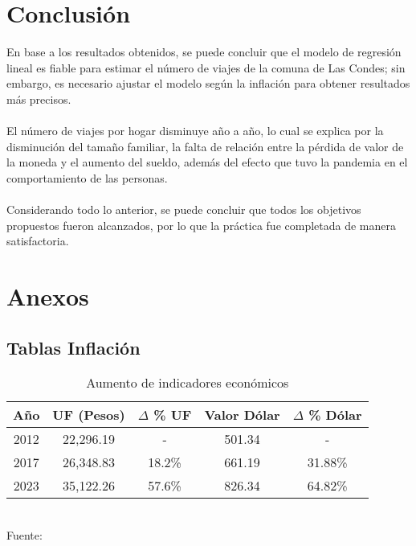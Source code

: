 \documentclass[12pt]{article} %
\begin{document}
\section{Conclusión}

En base a los resultados obtenidos, se puede concluir que el modelo de regresión lineal es fiable para estimar el número de viajes de la comuna de Las Condes; sin embargo, es necesario ajustar el modelo según la inflación para obtener resultados más precisos.
\\ \\
El número de viajes por hogar disminuye año a año, lo cual se explica por la disminución del tamaño familiar, la falta de relación entre la pérdida de valor de la moneda y el aumento del sueldo, además del efecto que tuvo la pandemia en el comportamiento de las personas.
\\ \\
Considerando todo lo anterior, se puede concluir que todos los objetivos propuestos fueron alcanzados, por lo que la práctica fue completada de manera satisfactoria.

\section{Anexos}

\subsection{Tablas Inflación}

\begin{table}[H]
    \centering
    \caption{Aumento de indicadores económicos}
    \vspace{0.2cm}
    \begin{tabular}{|c|c|c|c|c|}
        \hline
        Año & UF (Pesos) & $\Delta$ \% UF & Valor Dólar & $\Delta$ \% Dólar \\
        \hline
        2012 & 22,296.19 & - & 501.34 & - \\
        2017 & 26,348.83 & 18.2\% & 661.19 & 31.88\% \\
        2023 & 35,122.26 & 57.6\% & 826.34 & 64.82\% \\
        \hline
    \end{tabular}
    \vspace{0.2cm}
    \\Fuente: \textbf{\cite{sii}}
\end{table}
\end{document}
